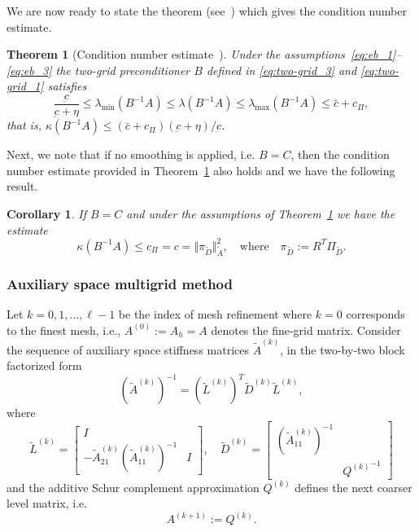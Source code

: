 \documentclass[11pt]{amsart}
\numberwithin{equation}{section}
\newtheorem{theorem}{Theorem}[section]
\newtheorem{corollary}{Corollary}[section]
\theoremstyle{definition}\newtheorem{example}{Example}[section]
\begin{document}
We are now ready to state the theorem (see~\cite{Kraus_Lymb_Mar_2014})
which gives the condition number estimate. 
\begin{theorem}[Condition number estimate~\cite{Kraus_Lymb_Mar_2014}]\label{thm:KLM}
Under the assumptions~\eqref{eq:eb_1}--\eqref{eq:eb_3} the two-grid preconditioner $B$ 
defined in \eqref{eq:two-grid_3} and \eqref{eq:two-grid_1} satisfies
\begin{equation} \label{eq:eb_7}
  \frac{\underbar{c}}{\underbar{c}+\eta} \le    \lambda_{\min}(B^{-1}A)  
\le \lambda(B^{-1}A) \le     \lambda_{\max}(B^{-1}A)\le\bar{c}+c_{\Pi},
\end{equation}
that is, $\kappa(B^{-1}A)\le 
(\bar{c}+c_{\Pi})(\underbar{c}+\eta)/\underbar{c}$.
\end{theorem}

Next, we note that if no
  smoothing is applied, i.e. $B=C$, then the condition number estimate
  provided in Theorem~\ref{thm:KLM} also holds and we have the
  following result.
\begin{corollary} If $B=C$ and under the assumptions of
  Theorem~\ref{thm:KLM} we have the estimate
\begin{equation}\label{eq:pi}
\kappa(B^{-1}A)\le c_{\Pi}=c=\Vert\pi_{\widetilde{D}}
\Vert^2_{\widetilde{A}},
\quad\mbox{where}\quad
\pi_{\widetilde{D}} := R^T \Pi_{\widetilde{D}} .
\end{equation}
\end{corollary}

\subsubsection{Auxiliary space multigrid method}\label{sec:asmg}
Let $k=0,1,\dots,\ell-1$ be the index of mesh refinement where $k=0$ corresponds
to the finest mesh, i.e., $A^{(0)}:=A_h=A$ denotes the fine-grid matrix. Consider
the sequence of auxiliary space stiffness matrices $\widetilde{A}^{(k)}$,
in the two-by-two block factorized form 
\begin{equation}\label{factorizationK}
({\widetilde{A}}^{(k)})^{-1} = 
(\widetilde{L}^{(k)})^T \widetilde{D}^{(k)} \widetilde{L}^{(k)} ,
\end{equation}
where
\begin{equation}\label{factorizationKl}
\widetilde{L}^{(k)} =
\left [
\begin{array}{cc}
I & \\
-\widetilde{A}^{(k)}_{21} (\widetilde{A}^{(k)}_{11})^{-1} & I
\end{array}
\right ] , \quad
\widetilde{D}^{(k)} =
\left [
\begin{array}{cc}
(\widetilde{A}^{(k)}_{11})^{-1} & \\
& {Q^{(k)}}^{-1}
\end{array}
\right ] 
\end{equation}
and 
the additive Schur complement approximation $Q^{(k)}$ defines the next coarser level matrix, i.e.
\begin{equation}\label{factorizationK2}
 A^{(k+1)}:=Q^{(k)}.
\end{equation}
\end{document}
